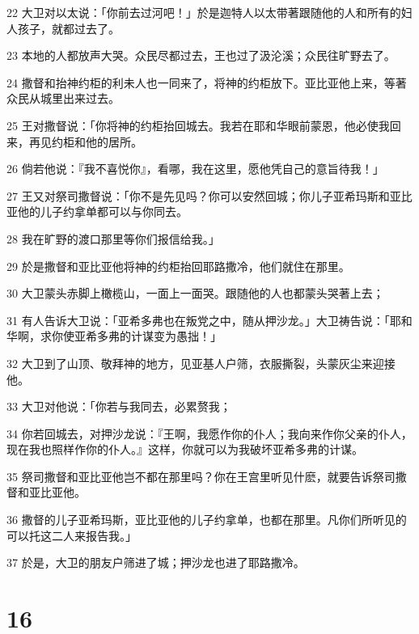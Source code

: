 \par 22 大卫对以太说：「你前去过河吧！」於是迦特人以太带著跟随他的人和所有的妇人孩子，就都过去了。
\par 23 本地的人都放声大哭。众民尽都过去，王也过了汲沦溪；众民往旷野去了。
\par 24 撒督和抬神约柜的利未人也一同来了，将神的约柜放下。亚比亚他上来，等著众民从城里出来过去。
\par 25 王对撒督说：「你将神的约柜抬回城去。我若在耶和华眼前蒙恩，他必使我回来，再见约柜和他的居所。
\par 26 倘若他说：『我不喜悦你』，看哪，我在这里，愿他凭自己的意旨待我！」
\par 27 王又对祭司撒督说：「你不是先见吗？你可以安然回城；你儿子亚希玛斯和亚比亚他的儿子约拿单都可以与你同去。
\par 28 我在旷野的渡口那里等你们报信给我。」
\par 29 於是撒督和亚比亚他将神的约柜抬回耶路撒冷，他们就住在那里。
\par 30 大卫蒙头赤脚上橄榄山，一面上一面哭。跟随他的人也都蒙头哭著上去；
\par 31 有人告诉大卫说：「亚希多弗也在叛党之中，随从押沙龙。」大卫祷告说：「耶和华啊，求你使亚希多弗的计谋变为愚拙！」
\par 32 大卫到了山顶、敬拜神的地方，见亚基人户筛，衣服撕裂，头蒙灰尘来迎接他。
\par 33 大卫对他说：「你若与我同去，必累赘我；
\par 34 你若回城去，对押沙龙说：『王啊，我愿作你的仆人；我向来作你父亲的仆人，现在我也照样作你的仆人。』这样，你就可以为我破坏亚希多弗的计谋。
\par 35 祭司撒督和亚比亚他岂不都在那里吗？你在王宫里听见什麽，就要告诉祭司撒督和亚比亚他。
\par 36 撒督的儿子亚希玛斯，亚比亚他的儿子约拿单，也都在那里。凡你们所听见的可以托这二人来报告我。」
\par 37 於是，大卫的朋友户筛进了城；押沙龙也进了耶路撒冷。

\chapter{16}

